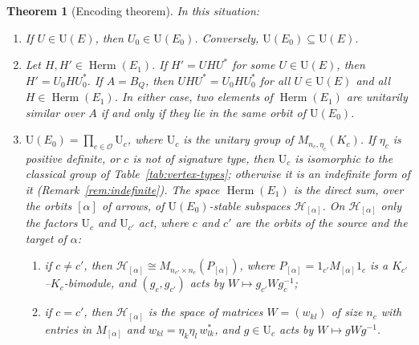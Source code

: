 \documentclass[12pt, a4paper]{report}
\theoremstyle{plain}
\newtheorem{theorem}{Theorem}[chapter]
\theoremstyle{definition}
\theoremstyle{remark}
\theoremstyle{plain}
\newcommand{\Un}{\mathrm{U}}
\newcommand{\Herm}{\operatorname{Herm}}
\begin{document}
\begin{theorem}[Encoding theorem]\label{thm:encoding}
In this situation:
\begin{enumerate}
  \item If $U\in\Un(E)$, then $U_0\in\Un(E_0)$. Conversely, $\Un(E_0)\subseteq\Un(E)$.
  \item Let $H,H'\in\Herm(E_1)$. If $H'=UHU^*$ for some $U\in\Un(E)$, then $H'=U_0HU_0^*$. If $A=B_Q$, then $UHU^*=U_0HU_0^*$ for all $U\in\Un(E)$ and all $H\in\Herm(E_1)$. In either case, two elements of $\Herm(E_1)$ are unitarily similar over $A$ if and only if they lie in the same orbit of $\Un(E_0)$.
  \item $\Un(E_0)=\prod_{c\in\mathcal O}\Un_c$, where $\Un_c$ is the unitary group of $M_{n_c,\eta_c}(K_c)$. If $\eta_c$ is positive definite, or $c$ is not of signature type, then $\Un_c$ is isomorphic to the classical group of Table~\ref{tab:vertex-types}; otherwise it is an indefinite form of it (Remark~\ref{rem:indefinite}). The space $\Herm(E_1)$ is the direct sum, over the orbits $[\alpha]$ of arrows, of $\Un(E_0)$-stable subspaces $\mathcal H_{[\alpha]}$. On $\mathcal H_{[\alpha]}$ only the factors $\Un_c$ and $\Un_{c'}$ act, where $c$ and $c'$ are the orbits of the source and the target of $\alpha$:
  \begin{enumerate}
    \item if $c\neq c'$, then $\mathcal H_{[\alpha]}\cong M_{n_{c'}\times n_c}(P_{[\alpha]})$, where $P_{[\alpha]}=1_{c'}M_{[\alpha]}1_c$ is a $K_{c'}$--$K_c$-bimodule, and $(g_c,g_{c'})$ acts by $W\mapsto g_{c'}Wg_c^{-1}$;
    \item if $c=c'$, then $\mathcal H_{[\alpha]}$ is the space of matrices $W=(w_{kl})$ of size $n_c$ with entries in $M_{[\alpha]}$ and $w_{kl}=\eta_k\eta_l\,w_{lk}^*$, and $g\in\Un_c$ acts by $W\mapsto gWg^{-1}$.
  \end{enumerate}
\end{enumerate}
\end{theorem}
\end{document}
